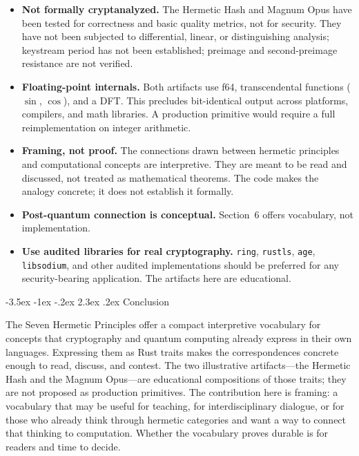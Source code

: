 \documentclass[12pt,a4paper]{article}
\makeatletter
\renewcommand\section{\@startsection{section}{1}{\z@}%
  {-3.5ex \@plus -1ex \@minus -.2ex}%
  {2.3ex \@plus.2ex}%
  {\needspace{10\baselineskip}\normalfont\Large\bfseries\sloppy\hyphenpenalty=10000\exhyphenpenalty=10000\hbadness=10000}}
\makeatother
\begin{document}
\begin{itemize}[nosep]
  \item \textbf{Not formally cryptanalyzed.} The Hermetic Hash and Magnum Opus have been tested for correctness and basic quality metrics, not for security. They have not been subjected to differential, linear, or distinguishing analysis; keystream period has not been established; preimage and second-preimage resistance are not verified.
  \item \textbf{Floating-point internals.} Both artifacts use f64, transcendental functions ($\sin$, $\cos$), and a DFT. This precludes bit-identical output across platforms, compilers, and math libraries. A production primitive would require a full reimplementation on integer arithmetic.
  \item \textbf{Framing, not proof.} The connections drawn between hermetic principles and computational concepts are interpretive. They are meant to be read and discussed, not treated as mathematical theorems. The code makes the analogy concrete; it does not establish it formally.
  \item \textbf{Post-quantum connection is conceptual.} Section~6 offers vocabulary, not implementation.
  \item \textbf{Use audited libraries for real cryptography.} \texttt{ring}, \texttt{rustls}, \texttt{age}, \texttt{libsodium}, and other audited implementations should be preferred for any security-bearing application. The artifacts here are educational.
\end{itemize}

\section{Conclusion}

The Seven Hermetic Principles offer a compact interpretive vocabulary for concepts that cryptography and quantum computing already express in their own languages. Expressing them as Rust traits makes the correspondences concrete enough to read, discuss, and contest. The two illustrative artifacts---the Hermetic Hash and the Magnum Opus---are educational compositions of those traits; they are not proposed as production primitives. The contribution here is framing: a vocabulary that may be useful for teaching, for interdisciplinary dialogue, or for those who already think through hermetic categories and want a way to connect that thinking to computation. Whether the vocabulary proves durable is for readers and time to decide.
\end{document}
